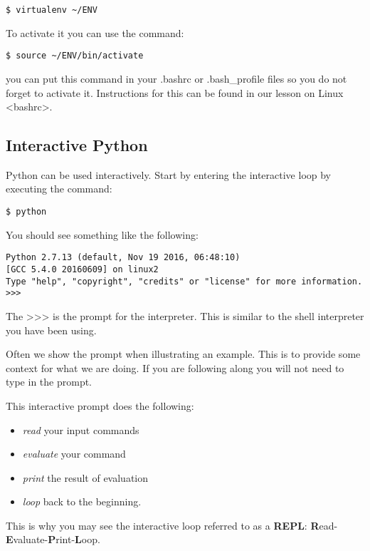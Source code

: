 \begin{verbatim}
$ virtualenv ~/ENV
\end{verbatim}

To activate it you can use the command:

\begin{verbatim}
$ source ~/ENV/bin/activate
\end{verbatim}

you can put this command in your .bashrc or .bash\_profile files so you
do not forget to activate it. Instructions for this can be
found in our lesson on Linux \textless{}bashrc\textgreater{}.

\subsection{Interactive Python}\label{interactive-python}

Python can be used interactively. Start by entering the interactive loop
by executing the command:

\begin{verbatim}
$ python
\end{verbatim}

You should see something like the following:

\begin{verbatim}
Python 2.7.13 (default, Nov 19 2016, 06:48:10)
[GCC 5.4.0 20160609] on linux2
Type "help", "copyright", "credits" or "license" for more information.
>>>
\end{verbatim}

The \textgreater{}\textgreater{}\textgreater{} is the prompt for the
interpreter. This is similar to the shell interpreter you have been
using.

Often we show the prompt when illustrating an example. This is to
provide some context for what we are doing. If you are following along
you will not need to type in the prompt.

This interactive prompt does the following:

\begin{itemize}
\tightlist
\item
  \emph{read} your input commands
\item
  \emph{evaluate} your command
\item
  \emph{print} the result of evaluation
\item
  \emph{loop} back to the beginning.
\end{itemize}

This is why you may see the interactive loop referred to as a
\textbf{REPL}:
\textbf{R}ead-\textbf{E}valuate-\textbf{P}rint-\textbf{L}oop.


